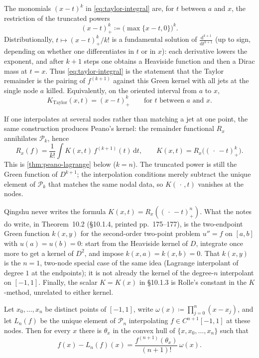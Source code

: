 \documentclass[11pt,a4paper]{article}
\begin{document}
\begin{remark}
\label{rem:truncated-power}
The monomials \((x-t)^{k}\) in \eqref{eq:taylor-integral} are, for \(t\) between \(a\) and \(x\), the restriction of the truncated powers
\[
(x-t)_{+}^{k}
\coloneqq
\bigl(\max\{x-t,0\}\bigr)^{k}.
\]
Distributionally, \(t\mapsto (x-t)_{+}^{k}/k!\) is a fundamental solution of \(\frac{\mathrm{d}^{k+1}}{\mathrm{d}t^{k+1}}\) (up to sign, depending on whether one differentiates in \(t\) or in \(x\)): each derivative lowers the exponent, and after \(k+1\) steps one obtains a Heaviside function and then a Dirac mass at \(t=x\). Thus \eqref{eq:taylor-integral} is the statement that the Taylor remainder is the pairing of \(f^{(k+1)}\) against this Green kernel with all jets at the single node \(a\) killed. Equivalently, on the oriented interval from \(a\) to \(x\),
\[
K_{\mathrm{Taylor}}(x,t)
=
(x-t)_{+}^{k}
\qquad
\text{for \(t\) between \(a\) and \(x\)}.
\]

If one interpolates at several nodes rather than matching a jet at one point, the same construction produces Peano's kernel: the remainder functional \(R_{x}\) annihilates \(\mathcal{P}_{k}\), hence
\[
R_{x}(f)
=
\frac{1}{k!}
\int K(x,t)\,f^{(k+1)}(t)\,\mathrm{d}t,
\qquad
K(x,t)
=
R_{x}\bigl((\,\cdot\,-t)_{+}^{k}\bigr).
\]
This is \cref{thm:peano-lagrange} below (\(k=n\)). The truncated power is still the Green function of \(D^{k+1}\); the interpolation conditions merely subtract the unique element of \(\mathcal{P}_{k}\) that matches the same nodal data, so \(K(\,\cdot\,,t)\) vanishes at the nodes.

Qingshu never writes the formula \(K(x,t)=R_{x}((\,\cdot\,-t)_{+}^{n})\). What the notes do write, in Theorem~10.2 (\S10.1.4, printed pp.~175--177), is the two-endpoint Green function \(k(x,y)\) for the second-order two-point problem \(u''=f\) on \([a,b]\) with \(u(a)=u(b)=0\): start from the Heaviside kernel of \(D\), integrate once more to get a kernel of \(D^{2}\), and impose \(k(x,a)=k(x,b)=0\). That \(k(x,y)\) is the \(n=1\), two-node special case of the same idea (Lagrange interpolant of degree \(1\) at the endpoints); it is not already the kernel of the degree-\(n\) interpolant on \([-1,1]\). Finally, the scalar \(K=K(x)\) in \S10.1.3 is Rolle's constant in the \(K\)-method, unrelated to either kernel.
\end{remark}

\begin{theorem}
\label{thm:lagrange-remainder}
Let \(x_{0},\ldots,x_{n}\) be distinct points of \([-1,1]\), write \(\omega(x)\coloneqq\prod_{j=0}^{n}(x-x_{j})\), and let \(L_{n}(f)\) be the unique element of \(\mathcal{P}_{n}\) interpolating \(f\in C^{n+1}[-1,1]\) at these nodes. Then for every \(x\) there is \(\theta_{x}\) in the convex hull of \(\{x,x_{0},\ldots,x_{n}\}\) such that
\[
f(x)-L_{n}(f)(x)
=
\frac{f^{(n+1)}(\theta_{x})}{(n+1)!}\,\omega(x).
\]
\end{theorem}
\end{document}
